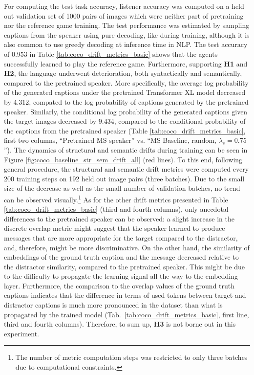 For computing the test task accuracy, listener accuracy was computed on a held out validation set of 1000 pairs of images which were neither part of pretraining nor the reference game training. The test performance was estimated by sampling captions from the speaker using pure decoding, like during training, although it is also common to use greedy decoding at inference time in NLP. The test accuracy of 0.953 in Table \ref{tab:coco_drift_metrics_basic} shows that the agents successfully learned to play the reference game. Furthermore, supporting \textbf{H1} and \textbf{H2}, the language underwent deterioration, both syntactically and semantically, compared to the pretrained speaker. More specifically, the average log probability of the generated captions under the pretrained Transformer XL model decreased by 4.312, compated to the log probability of captions generated by the pretrained speaker. Similarly, the conditional log probability of the generated captions given the target images decreased by 9.434, compared to the conditional probability of the captions from the pretrained speaker (Table \ref{tab:coco_drift_metrics_basic}, first two columns, ``Pretrained MS speaker'' vs. ``MS Baseline, random, $\lambda_s=0.75$''). The dynamics of structural and semantic drifts during training can be seen in Figure \ref{fig:coco_baseline_str_sem_drift_all} (red lines). To this end, following general procedure, the structural and semantic drift metrics were computed every 200 training steps on 192 held out image pairs (three batches). Due to the small size of the decrease as well as the small number of validation batches, no trend can be observed visually.\footnote{The number of metric computation steps was restricted to only three batches due to computational constraints.} 
As for the other drift metrics presented in Table \ref{tab:coco_drift_metrics_basic} (third and fourth columns), only anecdotal differences to the pretrained speaker can be observed: a slight increase in the discrete overlap metric might suggest that the speaker learned to produce messages that are more appropriate for the target compared to the distractor, and, therefore, might be more discriminative. On the other hand, the similarity of embeddings of the ground truth caption and the message decreased relative to the distractor similarity, compared to the pretrained speaker. This might be due to the difficulty to propagate the learning signal all the way to the embedding layer. Furthermore, the comparison to the overlap values of the ground truth captions indicates that the difference in terms of used tokens between target and distractor captions is much more pronounced in the dataset than what is propagated by the trained model (Tab.~\ref{tab:coco_drift_metrics_basic}, first line, third and fourth columns).  
Therefore, to sum up, \textbf{H3} is not borne out in this experiment.

